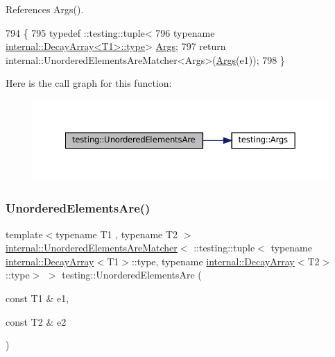 References Args().


\begin{DoxyCode}
794                                    \{
795   typedef ::testing::tuple<
796       \textcolor{keyword}{typename} \hyperlink{namespacegenerate__debs_a50bc9a7ecac9584553e089a448bcde58}{internal::DecayArray<T1>::type}> 
      \hyperlink{namespacetesting_a09ac462e8d6ed468cbfaa9c767aee0aa}{Args};
797   \textcolor{keywordflow}{return} internal::UnorderedElementsAreMatcher<Args>(\hyperlink{namespacetesting_a09ac462e8d6ed468cbfaa9c767aee0aa}{Args}(e1));
798 \}
\end{DoxyCode}
Here is the call graph for this function\+:
\nopagebreak
\begin{figure}[H]
\begin{center}
\leavevmode
\includegraphics[width=350pt]{namespacetesting_a0b81dd5584a3588cc2516b29ef166b7d_cgraph}
\end{center}
\end{figure}
\mbox{\label{namespacetesting_aedcecfa2107e03f5e2837f7124f73a87}} 
\subsubsection{\texorpdfstring{Unordered\+Elements\+Are()}{UnorderedElementsAre()}\hspace{0.1cm}{\footnotesize\ttfamily [3/11]}}
{\footnotesize\ttfamily template$<$typename T1 , typename T2 $>$ \\
\hyperlink{classtesting_1_1internal_1_1UnorderedElementsAreMatcher}{internal\+::\+Unordered\+Elements\+Are\+Matcher}$<$ \+::testing\+::tuple$<$ typename \hyperlink{structtesting_1_1internal_1_1DecayArray}{internal\+::\+Decay\+Array}$<$T1$>$\+::type, typename \hyperlink{structtesting_1_1internal_1_1DecayArray}{internal\+::\+Decay\+Array}$<$T2$>$\+::type$>$ $>$ testing\+::\+Unordered\+Elements\+Are (\begin{DoxyParamCaption}\item[{const T1 \&}]{e1,  }\item[{const T2 \&}]{e2 }\end{DoxyParamCaption})\hspace{0.3cm}{\ttfamily [inline]}}



